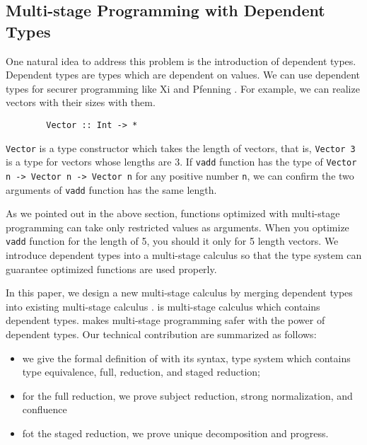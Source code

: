 
\subsection{Multi-stage Programming with Dependent Types}


One natural idea to address this problem is the introduction of dependent types.
Dependent types are types which are dependent on values.
We can use dependent types for securer programming like Xi and Pfenning \cite{Xi98}.
For example, we can realize vectors with their sizes with them.
\begin{verbatim}
        Vector :: Int -> *
\end{verbatim}
\verb|Vector| is a type constructor which takes the length of vectors, that is, 
\verb|Vector 3| is a type for vectors whose lengths are 3.
If \verb|vadd| function has the type of \verb|Vector n -> Vector n -> Vector n| for any positive number \verb|n|,
we can confirm the two arguments of \verb|vadd| function has the same length.

As we pointed out in the above section,
functions optimized with multi-stage programming can take only restricted values as arguments.
When you optimize \verb|vadd| function for the length of 5, you should it only for 5 length vectors.
We introduce dependent types into a multi-stage calculus
so that the type system can guarantee optimized functions are used properly.

In this paper, we design a new multi-stage calculus \LMD by 
merging dependent types into existing multi-stage calculus \LTP\cite{Hanada2014}.
\LMD is multi-stage calculus which contains dependent types.
\LMD makes multi-stage programming safer with the power of dependent types.
Our technical contribution are summarized as follows:
\begin{itemize}
        \item we give the formal definition of \LMD with its syntax, 
        type system which contains type equivalence, full, reduction, and staged reduction;
        \item for the full reduction, we prove subject reduction, strong normalization, and confluence
        \item fot the staged reduction, we prove unique decomposition and progress.
\end{itemize}

